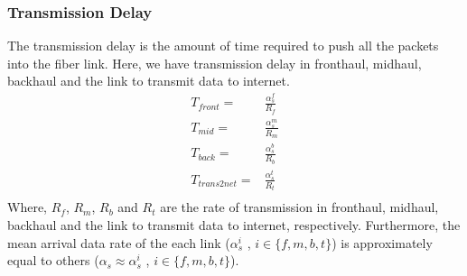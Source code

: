 \documentclass[conference]{IEEEtran}
\begin{document}
\subsubsection{Transmission Delay}
The transmission delay is the amount of time required to push all the packets into the fiber link. 
Here, we have transmission delay in fronthaul, midhaul, backhaul and the link to transmit data to internet.
\begin{equation}
\begin{split}
T_{front} =& \frac{\alpha_{s}^{f}}{R_f} \\
T_{mid} =&  \frac{\alpha_{s}^{m}}{R_m} \\
T_{back} =& \frac{\alpha_{s}^{b}}{R_b} \\
T_{trans2net} =& \frac{\alpha_{s}^{t}}{R_t} \\
\end{split}
\end{equation}
Where, $R_f$, $R_m$, $R_b$ and $R_t$ are the rate of transmission in fronthaul, midhaul, backhaul and the link to transmit data to internet, respectively.
Furthermore, the mean arrival data rate of the each link ($\alpha_{s}^i$ , $i \in \{f,m,b,t\}$) is approximately equal to others ($\alpha_{s} \approx \alpha_{s}^i$ , $i \in \{f,m,b,t\}$).  
\end{document}
